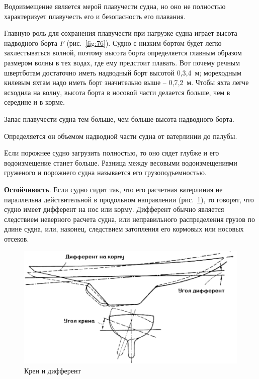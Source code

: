 \documentclass[a4paper, 12pt, twoside, final]{scrbook}
\begin{document}
Водоизмещение является мерой плавучести судна, но оно не полностью характеризует плавучесть его и безопасность его плавания.

Главную роль для сохранения плавучести при нагрузке судна играет высота надводного борта $F$ (рис.~\ref{fig:76}). Судно с низким бортом будет легко захлестываться волной, поэтому высота борта определяется главным образом размером волны в тех водах, где ему предстоит плавать. Вот почему речным швертботам достаточно иметь надводный борт высотой 0,3,4~м; мореходным килевым яхтам надо иметь борт значительно выше \--- 0,7,2~м. Чтобы яхта легче всходила на волну, высота борта в носовой части делается больше, чем в середине и в корме.

Запас плавучести судна тем больше, чем больше высота надводного борта.

Определяется он объемом надводной части судна от ватерлинии до палубы.

Если порожнее судно загрузить полностью, то оно сядет глубже и его водоизмещение станет больше. Разница между весовыми водоизмещениями груженого и порожнего судна называется его грузоподъемностью.

\textbf{Остойчивость}. Если судно сидит так, что его расчетная ватерлиния не параллельна действительной в продольном направлении (рис.~\ref{fig:77}), то говорят, что судно имеет дифферент на нос или корму. Дифферент обычно является следствием неверного расчета судна, или неправильного распределения грузов по длине судна, или, наконец, следствием затопления его кормовых или носовых отсеков.

\begin{figure}[htbp]
   \centering
   \includegraphics{pics/77_Kren_i_different} %
   \caption{Крен и дифферент}
   \label{fig:77}
\end{figure}
\end{document}
